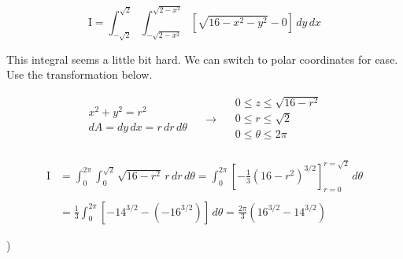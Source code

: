 \documentclass{article}
\begin{document}
\hfill

\begin{equation*}\mathrm{I}=\int_{-\sqrt2}^{\sqrt2}\int_{-\sqrt{2-x^2}}^{\sqrt{2-x^2}}\left[\sqrt{16-x^2-y^2}-0 \right]\,dy\,dx\end{equation*}

\hfill

\noindent This integral seems a little bit hard. We can switch to polar coordinates for ease. Use the transformation below.

\[
\begin{array}{c}
x^2+y^2=r^2\\
dA=dy\,dx =r\,dr\,d\theta
\end{array}\quad\rightarrow\quad
\begin{array}{c}
0\leq z\leq\sqrt{16-r^2}\\
0\leq r\leq \sqrt2\\
0\leq\theta\leq 2\pi\\
\end{array} 
\]

\begin{align*}\mathrm{I}&=\int_{0}^{2\pi}\int_{0}^{\sqrt{2}}\sqrt{16-r^2}\,r\,dr\,d\theta=\int_{0}^{2\pi}\left[-\frac13\left(16-r^2\right)^{3/2}\right]_{r=0}^{r=\sqrt2}\,d\theta\\\\&=\frac13\int_0^{2\pi}\left[-14^{3/2}-\left(-16^{3/2}\right)\right]\,d\theta=\boxed{\frac{2\pi}{3}\left(16^{3/2}-14^{3/2}\right)}
\end{align*}

\hfill

)

\hfill
\end{document}
